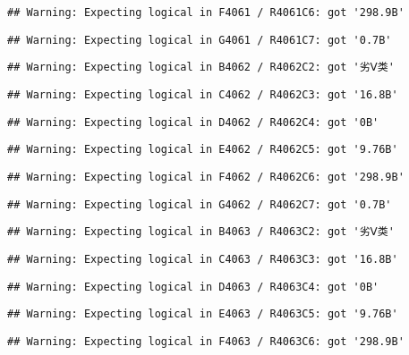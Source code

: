 \documentclass[
]{article}
\begin{document}
\begin{verbatim}
## Warning: Expecting logical in F4061 / R4061C6: got '298.9B'
\end{verbatim}

\begin{verbatim}
## Warning: Expecting logical in G4061 / R4061C7: got '0.7B'
\end{verbatim}

\begin{verbatim}
## Warning: Expecting logical in B4062 / R4062C2: got '劣Ⅴ类'
\end{verbatim}

\begin{verbatim}
## Warning: Expecting logical in C4062 / R4062C3: got '16.8B'
\end{verbatim}

\begin{verbatim}
## Warning: Expecting logical in D4062 / R4062C4: got '0B'
\end{verbatim}

\begin{verbatim}
## Warning: Expecting logical in E4062 / R4062C5: got '9.76B'
\end{verbatim}

\begin{verbatim}
## Warning: Expecting logical in F4062 / R4062C6: got '298.9B'
\end{verbatim}

\begin{verbatim}
## Warning: Expecting logical in G4062 / R4062C7: got '0.7B'
\end{verbatim}

\begin{verbatim}
## Warning: Expecting logical in B4063 / R4063C2: got '劣Ⅴ类'
\end{verbatim}

\begin{verbatim}
## Warning: Expecting logical in C4063 / R4063C3: got '16.8B'
\end{verbatim}

\begin{verbatim}
## Warning: Expecting logical in D4063 / R4063C4: got '0B'
\end{verbatim}

\begin{verbatim}
## Warning: Expecting logical in E4063 / R4063C5: got '9.76B'
\end{verbatim}

\begin{verbatim}
## Warning: Expecting logical in F4063 / R4063C6: got '298.9B'
\end{verbatim}
\end{document}

